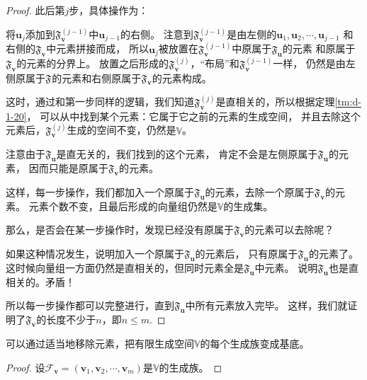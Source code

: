 \documentclass[12pt,UTF8,fontset=none]{ctexbook}
\begin{document}
\begin{appendix}
\begin{proof}
    此后第$j$步，具体操作为：

    将$\mathbf{u}_j$添加到$\mathfrak{F}_{\mathbf{v}}^{(j-1)}$中$\mathbf{u}_{j-1}$的右侧。
    注意到$\mathfrak{F}_{\mathbf{v}}^{(j-1)}$是由左侧的$\mathbf{u}_1, \mathbf{u}_2, \cdots , \mathbf{u}_{j-1}$
    和右侧的$\mathfrak{F}_{\mathbf{v}}$中元素拼接而成，
    所以$\mathbf{u}_j$被放置在$\mathfrak{F}_{\mathbf{v}}^{(j-1)}$中原属于$\mathfrak{F}_{\mathbf{u}}$的元素
    和原属于$\mathfrak{F}_{\mathbf{v}}$的元素的分界上。
    放置之后形成的$\mathfrak{F}_{\mathbf{v}}^{(j)}$，“布局”和$\mathfrak{F}_{\mathbf{v}}^{(j-1)}$一样，
    仍然是由左侧原属于$\mathfrak{F}_{\mathbf{}}$的元素和右侧原属于$\mathfrak{F}_{\mathbf{v}}$的元素构成。
    
    这时，通过和第一步同样的逻辑，我们知道$\mathfrak{F}_{\mathbf{v}}^{(j)}$是直相关的，所以根据定理\ref{tm:d-1-20}，
    可以从中找到某个元素：它属于它之前的元素的生成空间，
    并且去除这个元素后，$\mathfrak{F}_{\mathbf{v}}^{(j)}$生成的空间不变，仍然是$\mathbb{V}$。

    注意由于$\mathfrak{F}_{\mathbf{u}}$是直无关的，我们找到的这个元素，
    肯定不会是左侧原属于$\mathfrak{F}_{\mathbf{u}}$的元素，
    因而只能是原属于$\mathfrak{F}_{\mathbf{v}}$的元素。

    这样，每一步操作，我们都加入一个原属于$\mathfrak{F}_{\mathbf{u}}$的元素，去除一个原属于$\mathfrak{F}_{\mathbf{v}}$的元素。
    元素个数不变，且最后形成的向量组仍然是$\mathbb{V}$的生成集。

    那么，是否会在某一步操作时，发现已经没有原属于$\mathfrak{F}_{\mathbf{v}}$的元素可以去除呢？

    如果这种情况发生，说明加入一个原属于$\mathfrak{F}_{\mathbf{u}}$的元素后，
    只有原属于$\mathfrak{F}_{\mathbf{u}}$的元素了。
    这时候向量组一方面仍然是直相关的，但同时元素全是$\mathfrak{F}_{\mathbf{u}}$中元素。
    说明$\mathfrak{F}_{\mathbf{u}}$也是直相关的。矛盾！

    所以每一步操作都可以完整进行，直到$\mathfrak{F}_{\mathbf{u}}$中所有元素放入完毕。
    这样，我们就证明了$\mathfrak{F}_{\mathbf{v}}$的长度不少于$n$，即$n \leq m$.
\end{proof}

\begin{tm}\label{tm:d-1-40}
    可以通过适当地移除元素，把有限生成空间$\mathbb{V}$的每个生成族变成基底。
\end{tm}

\begin{proof}
    设$\mathcal{F}_{\mathbf{v}} = (\mathbf{v}_1, \mathbf{v}_2, \cdots , \mathbf{v}_m )$是$\mathbb{V}$的生成族。
    

\end{proof}
\end{appendix}
\end{document}
